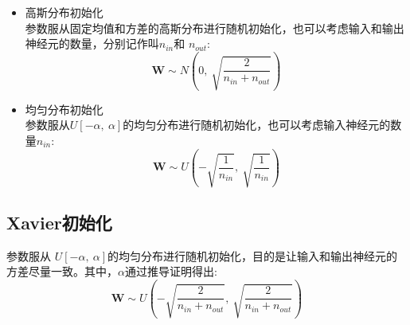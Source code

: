 \documentclass[UTF-8]{progbookcn}
\begin{document}
\begin{itemize}
  \item 高斯分布初始化\\
  参数服从固定均值和方差的高斯分布进行随机初始化，也可以考虑输入和输出神经元的数量，分别记作叫$n_{in}$和 $n_{out}$:
  \begin{equation}%
    \bm{W} \sim N(0, ~\sqrt{\frac{2}{n_{in}+n_{out}}})
  \end{equation}
  \item 均匀分布初始化\\
  参数服从$U[-\alpha, ~\alpha]$的均匀分布进行随机初始化，也可以考虑输入神经元的数量$n_{in}$:
  \begin{equation}%
    \bm{W} \sim U(-\sqrt{\frac{1}{n_{in}}},~ \sqrt{\frac{1}{n_{in}}})
  \end{equation}
\end{itemize}




\subsection{Xavier初始化}
参数服从 $U[-\alpha, ~\alpha]$的均匀分布进行随机初始化，目的是让输入和输出神经元的方差尽量一致\cite{pmlr-v9-glorot10a}。其中，$\alpha$通过推导证明得出:
\begin{equation}\label{Eq:Xavier}
    \bm{W} \sim U(-\sqrt{\frac{2}{n_{in}+n_{out}}},~ \sqrt{\frac{2}{n_{in}+n_{out}}})
  \end{equation}
\end{document}
